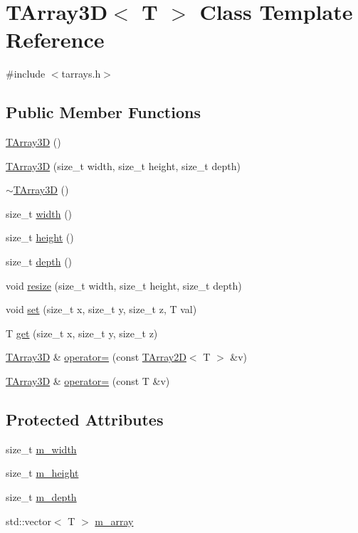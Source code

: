 \hypertarget{classTArray3D}{
\section{TArray3D$<$ T $>$ Class Template Reference}
\label{classTArray3D}
}


{\ttfamily \#include $<$tarrays.h$>$}\subsection*{Public Member Functions}
\begin{DoxyCompactItemize}
\item 
\hyperlink{classTArray3D_aa873df8def017abd44f790af8da75093}{TArray3D} ()
\item 
\hyperlink{classTArray3D_a7ac940512cc13a03f59db36304f9a9d9}{TArray3D} (size\_\-t width, size\_\-t height, size\_\-t depth)
\item 
\hyperlink{classTArray3D_aab64cc8e256350e80f20366f0388c9f1}{$\sim$TArray3D} ()
\item 
size\_\-t \hyperlink{classTArray3D_ac60676bad65591c46ed744bff1694908}{width} ()
\item 
size\_\-t \hyperlink{classTArray3D_a5c908ba2b371cc028c028448e9e522ed}{height} ()
\item 
size\_\-t \hyperlink{classTArray3D_a14f076bd64b1989e8f65a49366d7823f}{depth} ()
\item 
void \hyperlink{classTArray3D_a1679bd8e604f7ee577b4d5948e217ef4}{resize} (size\_\-t width, size\_\-t height, size\_\-t depth)
\item 
void \hyperlink{classTArray3D_a7324dc8c8bce78dce247c32a6f861c5f}{set} (size\_\-t x, size\_\-t y, size\_\-t z, T val)
\item 
T \hyperlink{classTArray3D_a8b2076b8a594dc5e69b143e12afbce1e}{get} (size\_\-t x, size\_\-t y, size\_\-t z)
\item 
\hyperlink{classTArray3D}{TArray3D} \& \hyperlink{classTArray3D_ad9eaf10799832b1ac819caaed368d7c1}{operator=} (const \hyperlink{classTArray2D}{TArray2D}$<$ T $>$ \&v)
\item 
\hyperlink{classTArray3D}{TArray3D} \& \hyperlink{classTArray3D_a8ac9b63c65f2ca5e068812f1e69f4900}{operator=} (const T \&v)
\end{DoxyCompactItemize}
\subsection*{Protected Attributes}
\begin{DoxyCompactItemize}
\item 
size\_\-t \hyperlink{classTArray3D_a5834f0bd1cd05ab379e50dd4227a880b}{m\_\-width}
\item 
size\_\-t \hyperlink{classTArray3D_a8560a24b0a789251c9093fa98b86dd09}{m\_\-height}
\item 
size\_\-t \hyperlink{classTArray3D_a7d1123fcaf6870716640855c3a98aa83}{m\_\-depth}
\item 
std::vector$<$ T $>$ \hyperlink{classTArray3D_acb49e26adbdbf0183b7876731a930345}{m\_\-array}
\end{DoxyCompactItemize}
